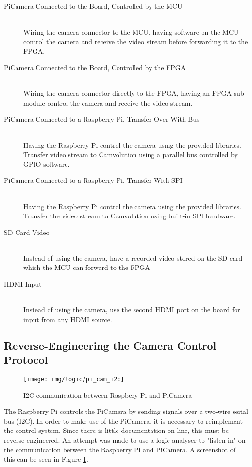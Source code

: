 \begin{description}
    \item[PiCamera Connected to the Board, Controlled by the MCU]
        \hfill\\
        Wiring the camera connector to the MCU, having software on the MCU control the camera and receive the video stream before forwarding it to the FPGA.
    \item[PiCamera Connected to the Board, Controlled by the FPGA]
        \hfill\\
        Wiring the camera connector directly to the FPGA, having an FPGA sub-module control the camera and receive the video stream.
    \item[PiCamera Connected to a Raspberry Pi, Transfer Over With Bus]
        \hfill\\
        Having the Raspberry Pi control the camera using the provided libraries.
        Transfer video stream to Camvolution using a parallel bus controlled by GPIO software.
    \item[PiCamera Connected to a Raspberry Pi, Transfer With SPI]
        \hfill\\
        Having the Raspberry Pi control the camera using the provided libraries.
        Transfer the video stream to Camvolution using built-in SPI hardware.
    \item[SD Card Video]
        \hfill\\
        Instead of using the camera, have a recorded video stored on the SD card which the MCU can forward to the FPGA.
    \item[HDMI Input]
        \hfill\\
        Instead of using the camera, use the second HDMI port on the board for input from any HDMI source.
\end{description}

\subsection{Reverse-Engineering the Camera Control Protocol}
\begin{figure}
    \centering
    \texttt{[image: img/logic/pi\_cam\_i2c]}
    \caption{I2C communication between Raspbery Pi and PiCamera}
    \label{fig:PiCamI2C}
\end{figure}

The Raspberry Pi controls the PiCamera by sending signals over a two-wire serial bus (I2C).
In order to make use of the PiCamera, it is necessary to reimplement the control system.
Since there is little documentation on-line, this must be reverse-engineered.
An attempt was made to use a logic analyser to "listen in" on the communication between the Raspberry Pi and PiCamera.
A screenshot of this can be seen in Figure \ref{fig:PiCamI2C}.

